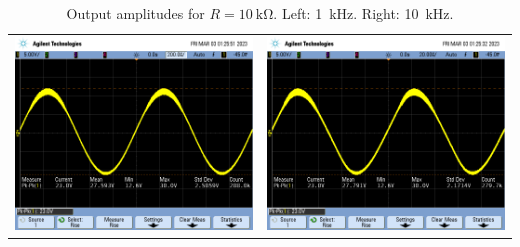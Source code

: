 \documentclass[11pt]{article}
\begin{document}
\begin{table}[H]
\caption{\label{fig:10k}Output amplitudes for \(R = \qty{10}{\kilo\ohm}\). Left: \qty{1}{\kilo\hertz}. Right: \qty{10}{\kilo\hertz}.}
\centering
\begin{tabular}{ll}
\includegraphics[width=8cm]{./10k_1k.png} & \includegraphics[width=8cm]{./10k_10k.png}\\[0pt]
\end{tabular}
\end{table}
\end{document}
